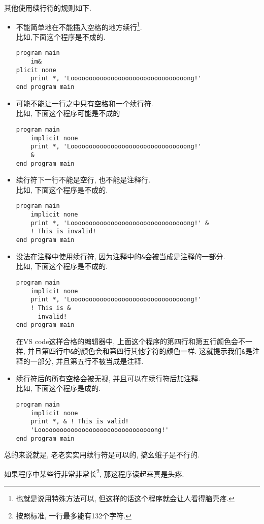 其他使用续行符的规则如下.
\begin{itemize}
    \item 不能简单地在不能插入空格的地方续行\footnote{
        也就是说用特殊方法可以, 但这样的话这个程序就会让人看得脑壳疼.
    }.\\比如,下面这个程序是不成的.\begin{lstlisting}
program main
    im&
plicit none
    print *, 'Loooooooooooooooooooooooooooooooong!'
end program main
    \end{lstlisting}
    \item 可能不能让一行之中只有空格和一个续行符.\\比如, 下面这个程序可能是不成的    \begin{lstlisting}
program main
    implicit none
    print *, 'Loooooooooooooooooooooooooooooooong!'
    &
end program main
    \end{lstlisting}
    \item 续行符下一行不能是空行, 也不能是注释行.\\比如, 下面这个程序是不成的.\begin{lstlisting}
program main
    implicit none
    print *, 'Loooooooooooooooooooooooooooooooong!' &
    ! This is invalid!
end program main
    \end{lstlisting}
    \item 没法在注释中使用续行符, 因为注释中的\texttt{\&{}}会被当成是注释的一部分.\\比如, 下面这个程序是不成的.\begin{lstlisting}
program main
    implicit none
    print *, 'Loooooooooooooooooooooooooooooooong!'
    ! This is &
      invalid!
end program main
    \end{lstlisting}在VS code这样合格的编辑器中, 上面这个程序的第四行和第五行颜色会不一样, 并且第四行中\texttt{\&{}}的颜色会和第四行其他字符的颜色一样. 这就提示我们\texttt{\&{}}是注释的一部分, 并且第五行不被当成是注释.
    \item 续行符后的所有空格会被无视, 并且可以在续行符后加注释.\\比如, 下面这个程序是成的.\begin{lstlisting}
program main
    implicit none
    print *, & ! This is valid!
    'Loooooooooooooooooooooooooooooooong!'
end program main
    \end{lstlisting}
\end{itemize}

总的来说就是, 老老实实用续行符是可以的, 搞幺蛾子是不行的.

如果程序中某些行非常非常长\footnote{
    按照标准, 一行最多能有132个字符.
}, 那这程序读起来真是头疼.

